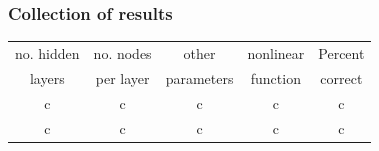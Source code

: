 \subsubsection{Collection of results}

\begin{table}[htbp]
	\centering
	\begin{tabular}{c c c c c}
	\toprule
	no. hidden 	& no. nodes	& other			& nonlinear	& Percent\\
	layers 			& per layer	& parameters	& function		& correct\\
	\midrule
	c & c & c & c & c\\
	c & c & c & c & c\\
	\bottomrule
	\end{tabular}
\end{table}

